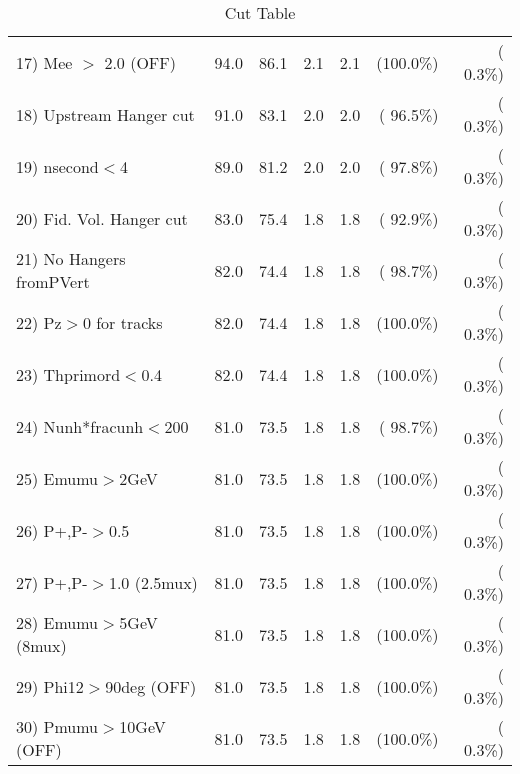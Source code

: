 \begin{table}[h!]
\begin{tabular}{||l||r|r|r|r|r|r||}
 17) Mee $>$ 2.0  (OFF)   &         94.0 &         86.1 &          2.1 &          2.1 & (100.0\%) & (  0.3\%) \\
 18) Upstream Hanger cut  &         91.0 &         83.1 &          2.0 &          2.0 & ( 96.5\%) & (  0.3\%) \\
 19) nsecond$<$4          &         89.0 &         81.2 &          2.0 &          2.0 & ( 97.8\%) & (  0.3\%) \\
 20) Fid. Vol. Hanger cut &         83.0 &         75.4 &          1.8 &          1.8 & ( 92.9\%) & (  0.3\%) \\
 21) No Hangers fromPVert &         82.0 &         74.4 &          1.8 &          1.8 & ( 98.7\%) & (  0.3\%) \\
 22) Pz$>$0 for tracks    &         82.0 &         74.4 &          1.8 &          1.8 & (100.0\%) & (  0.3\%) \\
 23) Thprimord$<$0.4      &         82.0 &         74.4 &          1.8 &          1.8 & (100.0\%) & (  0.3\%) \\
 24) Nunh*fracunh$<$200   &         81.0 &         73.5 &          1.8 &          1.8 & ( 98.7\%) & (  0.3\%) \\
 25) Emumu$>$2GeV         &         81.0 &         73.5 &          1.8 &          1.8 & (100.0\%) & (  0.3\%) \\
 26) P+,P-$>$0.5          &         81.0 &         73.5 &          1.8 &          1.8 & (100.0\%) & (  0.3\%) \\
 27) P+,P-$>$1.0 (2.5mux) &         81.0 &         73.5 &          1.8 &          1.8 & (100.0\%) & (  0.3\%) \\
 28) Emumu$>$5GeV  (8mux) &         81.0 &         73.5 &          1.8 &          1.8 & (100.0\%) & (  0.3\%) \\
 29) Phi12$>$90deg  (OFF) &         81.0 &         73.5 &          1.8 &          1.8 & (100.0\%) & (  0.3\%) \\
 30) Pmumu$>$10GeV  (OFF) &         81.0 &         73.5 &          1.8 &          1.8 & (100.0\%) & (  0.3\%) \\
 \hline
 \hline
 \end{tabular}
 \caption{Cut Table           }
 \label{tab-cutcohjpsi-mumu_cohpip}
 \end{table}
